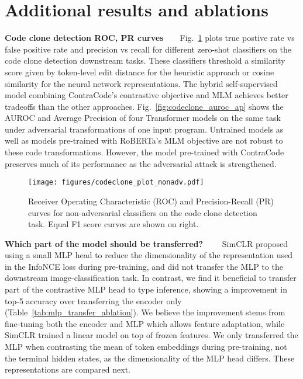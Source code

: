 \documentclass[11pt]{article}
\newcommand{\ours}[0]{ContraCode}
\begin{document}
\section{Additional results and ablations}
\label{sec:appendix_ablations}

\textbf{Code clone detection ROC, PR curves}~~~~Fig.~\ref{fig:codeclone_curves} plots true postive rate vs false positive rate and precision vs recall for different zero-shot classifiers on the code clone detection downstream tasks. These classifiers threshold a similarity score given by token-level edit distance for the heuristic approach or cosine similarity for the neural network representations. The hybrid self-supervised model combining \ours{}'s contrastive objective and MLM achieves better tradeoffs than the other approaches. Fig.~\ref{fig:codeclone_auroc_ap} shows the AUROC and Average Precision of four Transformer models on the same task under adversarial transformations of one input program. Untrained models as well as models pre-trained with RoBERTa's MLM objective are not robust to these code transformations. However, the model pre-trained with \ours{} preserves much of its performance as the adversarial attack is strengthened.

\begin{figure}[t]
    \centering
    \texttt{[image: figures/codeclone\_plot\_nonadv.pdf]}
    \caption{Receiver Operating Characteristic (ROC) and Precision-Recall (PR) curves for non-adversarial classifiers on the code clone detection task. Equal F1 score curves are shown on right.}
    \label{fig:codeclone_curves}
\end{figure}

\textbf{Which part of the model should be transferred?}~~~~
SimCLR \citep{chen2020simple} proposed using a small MLP head to reduce the dimensionality of the representation used in the InfoNCE loss during pre-training, and did not transfer the MLP to the downstream image-classification task. In contrast, we find it beneficial to transfer part of the contrastive MLP head to type inference, showing a  improvement in top-5 accuracy over transferring the encoder only (Table~\ref{tab:mlp_transfer_ablation}). We believe the improvement stems from fine-tuning both the encoder and MLP which allows feature adaptation, while SimCLR trained a linear model on top of frozen features. We only transferred the MLP when contrasting the mean of token embeddings during pre-training, not the terminal hidden states, as the dimensionality of the MLP head differs. These representations are compared next.
\end{document}
